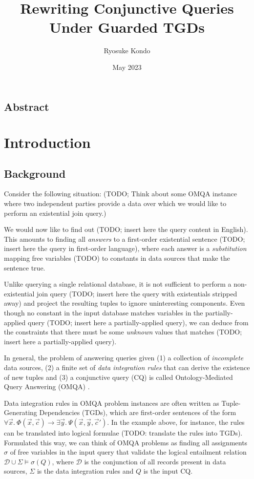 \documentclass[12pt]{report}
\title{Rewriting Conjunctive Queries \\ Under Guarded TGDs}
\author{Ryosuke Kondo}
\date{May 2023}
\theoremstyle{plain}
\theoremstyle{definition}
\begin{document}
\maketitle

\newpage
\tableofcontents
\newpage

\section*{Abstract}

\newpage
\chapter{Introduction}

\section{Background}

Consider the following situation: (TODO; Think about some OMQA instance where two independent parties provide a data over which we would like to perform an existential join query.)

We would now like to find out (TODO; insert here the query content in English). This amounts to finding all \emph{answers} to a first-order existential sentence (TODO; insert here the query in first-order language), where each answer is a \emph{substitution} mapping free variables (TODO) to constants in data sources that make the sentence true.

Unlike querying a single relational database, it is not sufficient to perform a non-existential join query (TODO; insert here the query with existentials stripped away) and project the resulting tuples to ignore uninteresting components. Even though no constant in the input database matches variables in the partially-applied query (TODO; insert here a partially-applied query), we can deduce from the constraints that there must be some \emph{unknown} values that matches (TODO; insert here a partially-applied query).

In general, the problem of answering queries given (1) a collection of \emph{incomplete} data sources, (2) a finite set of \emph{data integration rules} that can derive the existence of new tuples and (3) a conjunctive query (CQ) is called Ontology-Mediated Query Answering (OMQA) \cite{bienvenu16}.

Data integration rules in OMQA problem instances are often written as Tuple-Generating Dependencies (TGDs), which are first-order sentences of the form $\forall \vec{x}.\ \Phi(\vec{x}, \vec{c}) \rightarrow \exists \vec{y}.\ \Psi(\vec{x}, \vec{y}, \vec{c}')$. In the example above, for instance, the rules can be translated into logical formulae (TODO: translate the rules into TGDs). Formulated this way, we can think of OMQA problems as finding all assignments $\sigma$ of free variables in the input query that validate the logical entailment relation $\mathcal{D} \cup \Sigma \models \sigma(Q)$, where $\mathcal{D}$ is the conjunction of all records present in data sources, $\Sigma$ is the data integration rules and $Q$ is the input CQ.
\end{document}
